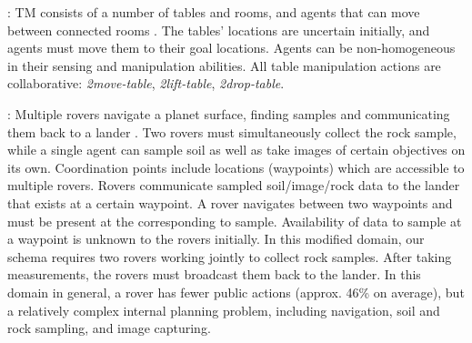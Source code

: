 \documentclass[letterpaper]{article} %
\theoremstyle{definition}
\begin{document}
: TM consists of a number of tables and rooms, and agents that can move between connected rooms \citep{ShekharB20}. 
The tables' locations are uncertain initially, and agents must move them to their goal locations. 
Agents can be non-homogeneous in their sensing and manipulation abilities.
All table manipulation actions are collaborative:
\emph{2move-table}, \emph{2lift-table}, \emph{2drop-table}.

: 
Multiple rovers navigate a planet surface, finding samples and communicating them back to a lander \citep{IMAP}.
Two rovers must simultaneously collect the rock sample, while a single agent can sample soil as well as take images of certain objectives on its own. 
Coordination points include locations (waypoints) which are accessible to multiple rovers. Rovers communicate sampled soil/image/rock data to the lander that exists at a certain waypoint. 
A rover navigates between two waypoints 
and must be present at the corresponding %
to sample. 
Availability of data to sample at a waypoint is unknown to the rovers initially. 
%
%
In this modified domain, our schema requires two rovers working jointly to collect rock samples. After taking measurements, the rovers must broadcast them back to the lander.
In this domain in general, a rover has fewer public actions (approx. 46\% on average), but a relatively complex internal planning problem, including navigation, soil and rock sampling, and image capturing.
%
\end{document}
